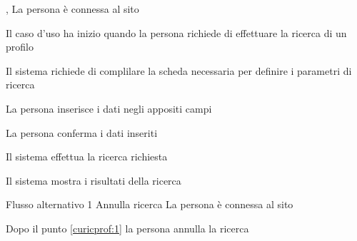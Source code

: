 
%

{, }
{La persona è connessa al sito}
{\postNulle}
{\begin{enumCU}
	\item Il caso d'uso ha inizio quando la persona richiede di effettuare la ricerca di un profilo
	\item Il sistema richiede di complilare la scheda necessaria per definire i parametri di ricerca
	\item La persona inserisce i dati negli appositi campi \label{curicprof:1}
	\item La persona conferma i dati inseriti
	\item Il sistema effettua la ricerca richiesta
	\item Il sistema mostra i risultati della ricerca
\end{enumCU}}
%
{Flusso alternativo 1}%
{Annulla ricerca}%
{La persona è connessa al sito}%
{\postNulle}%
{\begin{enumCU}
		\item Dopo il punto \ref{curicprof:1} la persona annulla la ricerca
	\end{enumCU}}%


%

